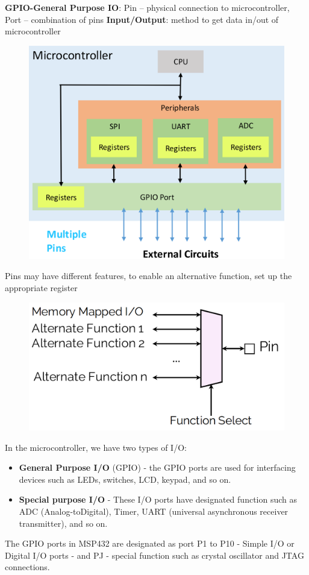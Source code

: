 \textbf{GPIO-General Purpose IO}: Pin – physical connection to microcontroller, Port – combination of pins
\textbf{Input/Output}: method to get data in/out of microcontroller

\begin{figure}[H]
    \centering
    \includegraphics[width=0.5\linewidth]{img/image56.png}
\end{figure}

Pins may have different features, to enable an alternative function, set up the appropriate register

\begin{figure}[H]
    \centering
    \includegraphics[width=0.5\linewidth]{img/image57.png}
\end{figure}

In the microcontroller, we have two types of I/O:

\begin{itemize}
    \item[] \textbf{General Purpose I/O} (GPIO) - the GPIO ports are used for interfacing devices such as LEDs, switches, LCD, keypad, and so on.
    \item[] \textbf{Special purpose I/O} - These I/O ports have designated function such as ADC (Analog-toDigital), Timer, UART (universal asynchronous receiver transmitter), and so on.
\end{itemize}

The GPIO ports in MSP432 are designated as port P1 to P10 - Simple I/O or Digital I/O ports - and PJ - special function such as crystal oscillator and JTAG connections.

\newpage
